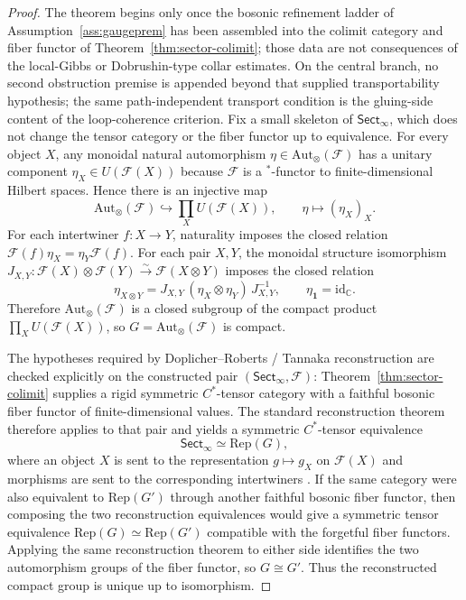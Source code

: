 \documentclass[11pt]{article}
\begin{document}
\begin{proof}
The theorem begins only once the bosonic refinement ladder of Assumption~\ref{ass:gaugeprem} has been assembled into the colimit category and fiber functor of Theorem~\ref{thm:sector-colimit}; those data are not consequences of the local-Gibbs or Dobrushin-type collar estimates. On the central branch, no second obstruction premise is appended beyond that supplied transportability hypothesis; the same path-independent transport condition is the gluing-side content of the loop-coherence criterion. Fix a small skeleton of \(\mathsf{Sect}_\infty\), which does not change the tensor category or the fiber functor up to equivalence. For every object \(X\), any monoidal natural automorphism \(\eta\in\mathrm{Aut}_\otimes(\mathcal F)\) has a unitary component \(\eta_X\in U(\mathcal F(X))\) because \(\mathcal F\) is a \(^*\)-functor to finite-dimensional Hilbert spaces. Hence there is an injective map
\[
\mathrm{Aut}_\otimes(\mathcal F)\hookrightarrow \prod_{X}U(\mathcal F(X)),\qquad
\eta\mapsto (\eta_X)_X.
\]
For each intertwiner \(f:X\to Y\), naturality imposes the closed relation \(\mathcal F(f)\eta_X=\eta_Y\mathcal F(f)\). For each pair \(X,Y\), the monoidal structure isomorphism \(J_{X,Y}:\mathcal F(X)\otimes\mathcal F(Y)\xrightarrow{\sim}\mathcal F(X\otimes Y)\) imposes the closed relation
\[
\eta_{X\otimes Y}=J_{X,Y}\,(\eta_X\otimes\eta_Y)\,J_{X,Y}^{-1},
\qquad
\eta_{\mathbf 1}=\mathrm{id}_{\mathbb C}.
\]
Therefore \(\mathrm{Aut}_\otimes(\mathcal F)\) is a closed subgroup of the compact product \(\prod_X U(\mathcal F(X))\), so \(G=\mathrm{Aut}_\otimes(\mathcal F)\) is compact.

The hypotheses required by Doplicher--Roberts / Tannaka reconstruction are checked explicitly on the constructed pair \((\mathsf{Sect}_\infty,\mathcal F)\): Theorem~\ref{thm:sector-colimit} supplies a rigid symmetric \(C^*\)-tensor category with a faithful bosonic fiber functor of finite-dimensional values. The standard reconstruction theorem therefore applies to that pair and yields a symmetric \(C^*\)-tensor equivalence
\[
\mathsf{Sect}_\infty \simeq \mathrm{Rep}(G),
\]
where an object \(X\) is sent to the representation \(g\mapsto g_X\) on \(\mathcal F(X)\) and morphisms are sent to the corresponding intertwiners \cite{dr89,dr90}. If the same category were also equivalent to \(\mathrm{Rep}(G')\) through another faithful bosonic fiber functor, then composing the two reconstruction equivalences would give a symmetric tensor equivalence \(\mathrm{Rep}(G)\simeq\mathrm{Rep}(G')\) compatible with the forgetful fiber functors. Applying the same reconstruction theorem to either side identifies the two automorphism groups of the fiber functor, so \(G\cong G'\). Thus the reconstructed compact group is unique up to isomorphism.
\end{proof}
\end{document}
